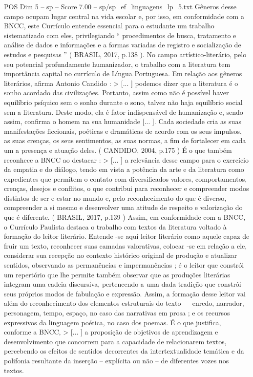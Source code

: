 \begin{textsample}{POS Dim 5 – sp – Score 7.00 – sp/sp\_ef\_linguagens\_lp\_5.txt}
Gêneros desse campo ocupam lugar central na vida escolar e, por isso, em conformidade com a BNCC, este Currículo entende essencial para o estudante um trabalho sistematizado com eles, privilegiando “ procedimentos de busca, tratamento e análise de dados e informações e a formas variadas de registro e socialização de estudos e pesquisas ” ( BRASIL, 2017, p.138 ).
No campo artístico-literário, pelo seu potencial profundamente humanizador, o trabalho com a literatura tem importância capital no currículo de Língua Portuguesa.
Em relação aos gêneros literários, afirma Antonio Candido : > [... ] podemos dizer que a literatura é o sonho acordado das civilizações.
Portanto, assim como não é possível haver equilíbrio psíquico sem o sonho durante o sono, talvez não haja equilíbrio social sem a literatura.
Deste modo, ela é fator indispensável de humanização e, sendo assim, confirma o homem na sua humanidade [... ].
Cada sociedade cria as suas manifestações ficcionais, poéticas e dramáticas de acordo com os seus impulsos, as suas crenças, os seus sentimentos, as suas normas, a fim de fortalecer em cada um a presença e atuação deles. ( CANDIDO, 2004, p.175 ) É o que também reconhece a BNCC ao destacar : > [... ] a relevância desse campo para o exercício da empatia e do diálogo, tendo em vista a potência da arte e da literatura como expedientes que permitem o contato com diversificados valores, comportamentos, crenças, desejos e conflitos, o que contribui para reconhecer e compreender modos distintos de ser e estar no mundo e, pelo reconhecimento do que é diverso, compreender a si mesmo e desenvolver uma atitude de respeito e valorização do que é diferente. ( BRASIL, 2017, p.139 ) Assim, em conformidade com a BNCC, o Currículo Paulista destaca o trabalho com textos da literatura voltado à formação do leitor literário.
Entende -se aqui leitor literário como aquele capaz de fruir um texto, reconhecer suas camadas valorativas, colocar -se em relação a ele, considerar sua recepção no contexto histórico original de produção e atualizar sentidos, observando as permanências e impermanências ; é o leitor que constrói um repertório que lhe permite também observar que as produções literárias integram uma cadeia discursiva, pertencendo a uma dada tradição que constrói seus próprios modos de fabulação e expressão.
Assim, a formação desse leitor vai além do reconhecimento dos elementos estruturais do texto — enredo, narrador, personagem, tempo, espaço, no caso das narrativas em prosa ; e os recursos expressivos da linguagem poética, no caso dos poemas.
É o que justifica, conforme a BNCC, > [... ] a proposição de objetivos de aprendizagem e desenvolvimento que concorrem para a capacidade de relacionarem textos, percebendo os efeitos de sentidos decorrentes da intertextualidade temática e da polifonia resultante da inserção – explícita ou não – de diferentes vozes nos textos.

\end{textsample}
